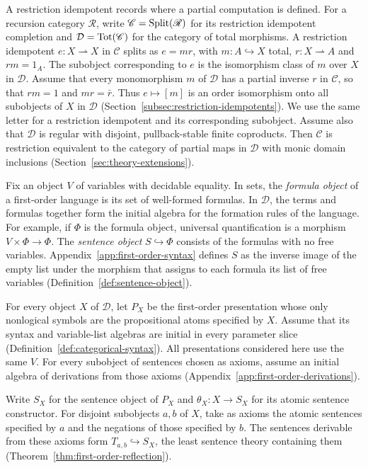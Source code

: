 A restriction idempotent records where a partial computation is defined.
For a recursion category $\mathscr R$, write $\mathscr C=\operatorname{Split}(\mathscr R)$
for its restriction idempotent completion and $\mathcal D=\operatorname{Tot}(\mathscr C)$
for the category of total morphisms. A restriction idempotent
$e:X\rightharpoonup X$ in $\mathscr C$ splits as $e=mr$, with
$m:A\hookrightarrow X$ total, $r:X\rightharpoonup A$ and $rm=1_A$.
The subobject corresponding to $e$ is the isomorphism class of $m$
over $X$ in $\mathcal D$. Assume that every monomorphism $m$ of
$\mathcal D$ has a partial inverse $r$ in $\mathscr C$, so that
$rm=1$ and $mr=\bar r$. Thus $e\mapsto[m]$ is an order isomorphism onto
all subobjects of $X$ in $\mathcal D$ (Section~\ref{subsec:restriction-idempotents}).
We use the same letter for a restriction idempotent and its corresponding
subobject.
Assume also that $\mathcal D$ is regular with disjoint, pullback-stable
finite coproducts. Then $\mathscr C$ is restriction equivalent to the
category of partial maps in $\mathcal D$ with monic domain inclusions
(Section~\ref{sec:theory-extensions}).

Fix an object $V$ of variables with decidable equality. In sets, the
\emph{formula object} of a first-order language is its set of well-formed
formulas. In $\mathcal D$, the terms and formulas together form the initial
algebra for the formation rules of the language. For example, if $\Phi$
is the formula object, universal quantification is a morphism
$V\times\Phi\to\Phi$. The \emph{sentence object} $S\hookrightarrow\Phi$
consists of the formulas with no free variables. Appendix~\ref{app:first-order-syntax}
defines $S$ as the inverse image of the empty list under the morphism
that assigns to each formula its list of free variables
(Definition~\ref{def:sentence-object}).

For every object $X$ of $\mathcal D$, let $P_X$ be the first-order
presentation whose only nonlogical symbols are the propositional atoms
specified by $X$. Assume that its syntax and variable-list algebras are
initial in every parameter slice (Definition~\ref{def:categorical-syntax}).
All presentations considered here use the same $V$. For every subobject
of sentences chosen as axioms, assume an initial algebra of derivations
from those axioms (Appendix~\ref{app:first-order-derivations}).

Write $S_X$ for the sentence object of $P_X$ and $\theta_X:X\to S_X$
for its atomic sentence constructor. For disjoint subobjects $a,b$ of $X$, take as axioms
the atomic sentences specified by $a$ and the negations of those specified
by $b$. The sentences derivable from these axioms form
$T_{a,b}\hookrightarrow S_X$, the least sentence theory containing them
(Theorem~\ref{thm:first-order-reflection}).


